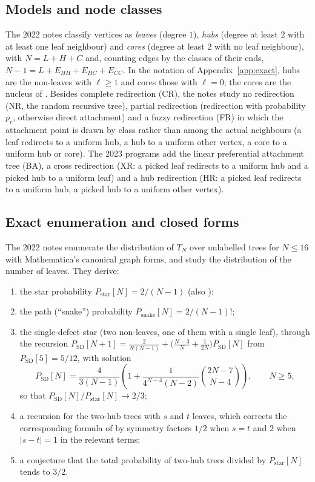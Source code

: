 \documentclass[11pt]{article}
\theoremstyle{plain}
\theoremstyle{definition}
\theoremstyle{remark}
\begin{document}
\subsection*{Models and node classes}
The 2022 notes classify vertices as \emph{leaves} (degree $1$), \emph{hubs} (degree at least $2$ with at least one leaf neighbour) and \emph{cores} (degree at least $2$ with no leaf neighbour), with $N=L+H+C$ and, counting edges by the classes of their ends, $N-1=L+E_{HH}+E_{HC}+E_{CC}$. In the notation of Appendix~\ref{app:exact}, hubs are the non-leaves with $\ell\ge1$ and cores those with $\ell=0$; the cores are the nucleus of \cite{HKRZ2026}. Besides complete redirection (CR), the notes study no redirection (NR, the random recursive tree), partial redirection (redirection with probability $p_r$, otherwise direct attachment) and a fuzzy redirection (FR) in which the attachment point is drawn by class rather than among the actual neighbours (a leaf redirects to a uniform hub, a hub to a uniform other vertex, a core to a uniform hub or core). The 2023 programs add the linear preferential attachment tree (BA), a cross redirection (XR: a picked leaf redirects to a uniform hub and a picked hub to a uniform leaf) and a hub redirection (HR: a picked leaf redirects to a uniform hub, a picked hub to a uniform other vertex).

\subsection*{Exact enumeration and closed forms}
The 2022 notes enumerate the distribution of $T_N$ over unlabelled trees for $N\le16$ with Mathematica's canonical graph forms, and study the distribution of the number of leaves. They derive:
\begin{enumerate}
\item the star probability $P_{\mathrm{star}}[N]=2/(N-1)$ (also \cite[(A4)]{HKRZ2026});
\item the path (``snake'') probability $P_{\mathrm{snake}}[N]=2/(N-1)!$;
\item the single-defect star (two non-leaves, one of them with a single leaf), through the recursion $P_{\mathrm{SD}}[N+1]=\frac{2}{N(N-1)}+\bigl(\frac{N-3}{N}+\frac{1}{2N}\bigr)P_{\mathrm{SD}}[N]$ from $P_{\mathrm{SD}}[5]=5/12$, with solution
\[
P_{\mathrm{SD}}[N]=\frac{4}{3(N-1)}\left(1+\frac{1}{4^{N-4}(N-2)}\binom{2N-7}{N-4}\right),\qquad N\ge5,
\]
so that $P_{\mathrm{SD}}[N]/P_{\mathrm{star}}[N]\to2/3$;
\item a recursion for the two-hub trees with $s$ and $t$ leaves, which corrects the corresponding formula of \cite{KR2017} by symmetry factors $1/2$ when $s=t$ and $2$ when $|s-t|=1$ in the relevant terms;
\item a conjecture that the total probability of two-hub trees divided by $P_{\mathrm{star}}[N]$ tends to $3/2$.
\end{enumerate}
\end{document}
